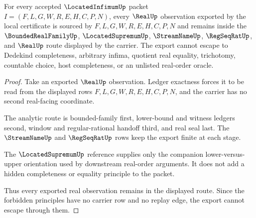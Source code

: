 \begin{theorem}
\label{thm:located-infimum-real-export-nonescape}
For every accepted $\LocatedInfimumUp$ packet $I=(F,L,G,W,R,E,H,C,P,N)$, every $\RealUp$ observation exported by the local certificate is sourced by $F,L,G,W,R,E,H,C,P,N$ and remains inside the $\BoundedRealFamilyUp$, $\LocatedSupremumUp$, $\StreamNameUp$, $\RegSeqRatUp$, and $\RealUp$ route displayed by the carrier. The export cannot escape to Dedekind completeness, arbitrary infima, quotient real equality, trichotomy, countable choice, host completeness, or an unlisted real-order oracle.
\end{theorem}
\begin{proof}
Take an exported $\RealUp$ observation. Ledger exactness forces it to be read from the displayed rows $F,L,G,W,R,E,H,C,P,N$, and the carrier has no second real-facing coordinate.

The analytic route is bounded-family first, lower-bound and witness ledgers second, window and regular-rational handoff third, and real seal last. The $\StreamNameUp$ and $\RegSeqRatUp$ rows keep the export finite at each stage.

The $\LocatedSupremumUp$ reference supplies only the companion lower-versus-upper orientation used by downstream real-order arguments. It does not add a hidden completeness or equality principle to the packet.

Thus every exported real observation remains in the displayed route. Since the forbidden principles have no carrier row and no replay edge, the export cannot escape through them.
\end{proof}

